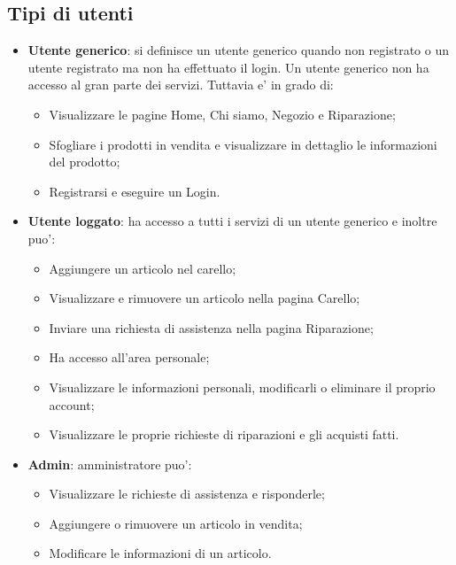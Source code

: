\subsection{Tipi di utenti}
\begin{itemize}
	\item \textbf{Utente generico}: si definisce un utente generico quando non registrato o
	un utente registrato ma non ha effettuato il login. Un utente generico non ha accesso 
	al gran parte dei servizi. Tuttavia e' in grado di: 
	\begin{itemize}
	\item Visualizzare le pagine Home, Chi siamo, Negozio e Riparazione;
	\item Sfogliare i prodotti in vendita e visualizzare in dettaglio le informazioni del prodotto;
	\item Registrarsi e eseguire un Login.
	\end{itemize}

	\item \textbf{Utente loggato}: ha accesso a tutti i servizi di un utente generico e inoltre puo':
	\begin{itemize}
	\item Aggiungere un articolo nel carello;
	\item Visualizzare e rimuovere un articolo nella pagina Carello;
	\item Inviare una richiesta di assistenza nella pagina Riparazione;
	\item Ha accesso all'area personale;
	\item Visualizzare le informazioni personali, modificarli o eliminare il proprio account;
	\item Visualizzare le proprie richieste di riparazioni e gli acquisti fatti.
	\end{itemize}

	\item \textbf{Admin}: amministratore puo':
	\begin{itemize}
	\item Visualizzare le richieste di assistenza e risponderle;
	\item Aggiungere o rimuovere un articolo in vendita;
	\item Modificare le informazioni di un articolo.
	\end{itemize}
\end{itemize}



